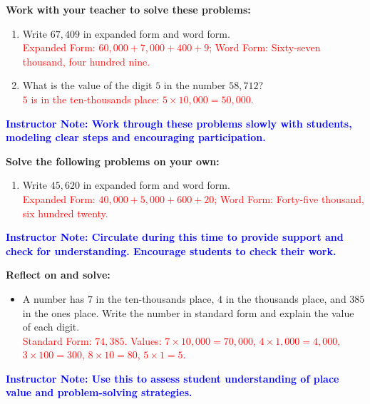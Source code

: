 \documentclass[12pt]{article}
\newcommand{\solution}[1]{\textcolor{red}{#1}}
\newcommand{\note}[1]{\textcolor{blue}{\textbf{Instructor Note: #1}}}
\begin{document}
\begin{tcolorbox}[colframe=black!60, colback=white, 
coltitle=black, colbacktitle=black!15, fonttitle=\bfseries\Large, 
title=Guided Practice, halign title=center, left=10pt, right=10pt, top=10pt, bottom=15pt]
\textbf{Work with your teacher to solve these problems:}
\begin{enumerate}[itemsep=3em]
    \item Write \( 67,409 \) in expanded form and word form.\\
    \solution{Expanded Form: \( 60,000 + 7,000 + 400 + 9 \); Word Form: Sixty-seven thousand, four hundred nine.}
    \item What is the value of the digit \( 5 \) in the number \( 58,712 \)?\\
    \solution{\( 5 \) is in the ten-thousands place: \( 5 \times 10,000 = 50,000 \).}
\end{enumerate}

\note{Work through these problems slowly with students, modeling clear steps and encouraging participation.}
\end{tcolorbox}

\begin{tcolorbox}[colframe=black!60, colback=white, 
coltitle=black, colbacktitle=black!15, fonttitle=\bfseries\Large, 
title=Independent Practice, halign title=center, left=10pt, right=10pt, top=10pt, bottom=15pt]
\textbf{Solve the following problems on your own:}
\begin{enumerate}[itemsep=3em]
    \item Write \( 45,620 \) in expanded form and word form.\\
    \solution{Expanded Form: \( 40,000 + 5,000 + 600 + 20 \); Word Form: Forty-five thousand, six hundred twenty.}
\end{enumerate}

\note{Circulate during this time to provide support and check for understanding. Encourage students to check their work.}
\end{tcolorbox}

\begin{tcolorbox}[colframe=black!60, colback=white, 
coltitle=black, colbacktitle=black!15, fonttitle=\bfseries\Large, 
title=Exit Ticket, halign title=center, left=10pt, right=10pt, top=10pt, bottom=15pt]
\textbf{Reflect on and solve:}
\begin{itemize}
    \item A number has \( 7 \) in the ten-thousands place, \( 4 \) in the thousands place, and \( 385 \) in the ones place. Write the number in standard form and explain the value of each digit.\\
    \solution{Standard Form: \( 74,385 \). Values: \( 7 \times 10,000 = 70,000 \), \( 4 \times 1,000 = 4,000 \), \( 3 \times 100 = 300 \), \( 8 \times 10 = 80 \), \( 5 \times 1 = 5 \).}
\end{itemize}

\note{Use this to assess student understanding of place value and problem-solving strategies.}
\end{tcolorbox}
\end{document}

